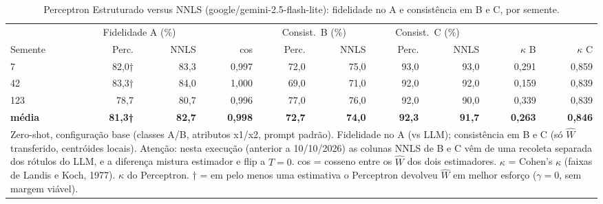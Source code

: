 \begin{table}[htbp]
\centering
\small
\caption{Perceptron Estruturado versus NNLS (google/gemini-2.5-flash-lite): fidelidade no A e consistência em B e C, por semente.}
\label{tab:bloco1_A_perceptron_vs_nnls_por_semente_flashlite}
\begin{tabular}{lrrrrrrrrr}
\toprule
 & \multicolumn{2}{c}{Fidelidade A (\%)} &  & \multicolumn{2}{c}{Consist.\ B (\%)} & \multicolumn{2}{c}{Consist.\ C (\%)} &  &  \\ \cmidrule(lr){2-3} \cmidrule(lr){5-6} \cmidrule(lr){7-8}
Semente & Perc. & NNLS & cos & Perc. & NNLS & Perc. & NNLS & $\kappa$ B & $\kappa$ C \\
\midrule
7 & 82,0† & 83,3 & 0,997 & 72,0 & 75,0 & 93,0 & 93,0 & 0,291 & 0,859 \\
42 & 83,3† & 84,0 & 1,000 & 69,0 & 71,0 & 92,0 & 92,0 & 0,159 & 0,839 \\
123 & 78,7 & 80,7 & 0,996 & 77,0 & 76,0 & 92,0 & 90,0 & 0,339 & 0,839 \\
\midrule
\textbf{média} & \textbf{81,3†} & \textbf{82,7} & \textbf{0,998} & \textbf{72,7} & \textbf{74,0} & \textbf{92,3} & \textbf{91,7} & \textbf{0,263} & \textbf{0,846} \\
\bottomrule
\multicolumn{10}{p{0.95\linewidth}}{\footnotesize Zero-shot, configuração base (classes A/B, atributos x1/x2, prompt padrão). Fidelidade no A (vs LLM); consistência em B e C (só $\hat{W}$ transferido, centróides locais). Atenção: nesta execução (anterior a 10/10/2026) as colunas NNLS de B e C vêm de uma recoleta separada dos rótulos do LLM, e a diferença mistura estimador e flip a $T=0$. cos = cosseno entre os $\hat{W}$ dos dois estimadores. $\kappa$ = Cohen's $\kappa$ (faixas de Landis e Koch, 1977). $\kappa$ do Perceptron. † = em pelo menos uma estimativa o Perceptron devolveu $\hat{W}$ em melhor esforço ($\gamma = 0$, sem margem viável).} \\
\end{tabular}
\end{table}
